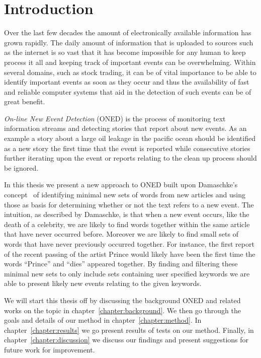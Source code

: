 \chapter{Introduction}
\label{chapter:introduction}
Over the last few decades the amount of electronically available information has grown rapidly. The daily amount of information that is uploaded to sources such as the internet is so vast that it has become impossible for any human to keep process it all and keeping track of important events can be overwhelming. Within several domains, such as stock trading, it can be of vital importance to be able to identify important events as soon as they occur and thus the availability of fast and reliable computer systems that aid in the detection of such events can be of great benefit. 

\emph{On-line New Event Detection} (ONED) is the process of monitoring text information streams and detecting stories that report about new events. As an example a story about a large oil leakage in the pacific ocean should be identified as a new story the first time that the event is reported while consecutive stories further iterating upon the event or reports relating to the clean up process should be ignored. 

In this thesis we present a new approach to ONED built upon Damaschke's concept~\cite{damaschke2015pairs} of identifying minimal new sets of words from new articles and using those as basis for determining whether or not the text refers to a new event. The intuition, as described by Damaschke, is that when a new event occurs, like the death of a celebrity, we are likely to find words together within the same article that have never occurred before. Moreover we are likely to find small sets of words that have never previously occurred together. For instance, the first report of the recent passing of the artist Prince would likely have been the first time the words ``Prince'' and ``dies'' appeared together. By finding and filtering these minimal new sets to only include sets containing user specified keywords we are able to present likely new events relating to the given keywords.

We will start this thesis off by discussing the background ONED and related works on the topic in chapter~\ref{chapter:background}. We then go through the goals and details of our method in chapter~\ref{chapter:method}. In chapter~\ref{chapter:results} we go present results of tests on our method. Finally, in chapter~\ref{chapter:discussion} we discuss our findings and present suggestions for future work for improvement.
